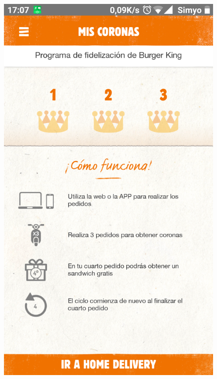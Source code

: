 \documentclass[twoside]{report}
\begin{document}
\begin{figure}[H]
\begin{center}
\includegraphics[scale=0.10]{images/restaurantes/burry0.png}

\end{center}
\end{figure}
\end{document}
